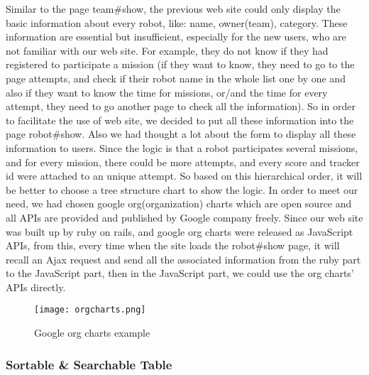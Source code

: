 Similar to the page team\#show, the previous web site could only display the basic information about every robot, like: name, owner(team), category. These information are essential but insufficient, especially for the new users, who are not familiar with our web site. For example, they do not know if they had registered to participate a mission (if they want to know, they need to go to the page attempts, and check if their robot name in the whole list one by one and also if they want to know the time for missions, or/and the time for every attempt, they need to go another page to check all the information). So in order to facilitate the use of web site, we decided to put all these information into the page robot\#show. Also we had thought a lot about the form to display all these information to users. Since the logic is that a robot participates several missions, and for every mission, there could be more attempts, and every score and tracker id were attached to an unique attempt. So based on this hierarchical order, it will be better to choose a tree structure chart to show the logic. In order to meet our need, we had chosen google org(organization) charts which are open source and all APIs are provided and published by Google company freely. Since our web site was built up by ruby on rails, and google org charts were released as JavaScript APIs, from this, every time when the site loads the robot\#show page, it will recall an Ajax request and send all the associated information from the ruby part to the JavaScript part, then in the JavaScript part, we could use the org charts' APIs directly. 
\begin{figure}[h!]
\centering
\texttt{[image: orgcharts.png]}
\caption{Google org charts example }
\label{fig-sample}
\end{figure}

\subsubsection{Sortable \& Searchable Table}

